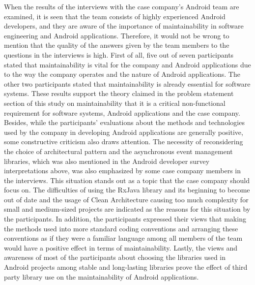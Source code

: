 When the results of the interviews with the case company's Android team are examined, it is seen that the team consists of highly experienced Android developers, and they are aware of the importance of maintainability in software engineering and Android applications. Therefore, it would not be wrong to mention that the quality of the answers given by the team members to the questions in the interviews is high. First of all, five out of seven participants stated that maintainability is vital for the company and Android applications due to the way the company operates and the nature of Android applications. The other two participants stated that maintainability is already essential for software systems. These results support the theory claimed in the problem statement section of this study on maintainability that it is a critical non-functional requirement for software systems, Android applications and the case company. Besides, while the participants' evaluations about the methods and technologies used by the company in developing Android applications are generally positive, some constructive criticism also draws attention. The necessity of reconsidering the choice of architectural pattern and the asynchronous event management libraries, which was also mentioned in the Android developer survey interpretations above, was also emphasized by some case company members in the interviews. This situation stands out as a topic that the case company should focus on. The difficulties of using the RxJava library and its beginning to become out of date and the usage of Clean Architecture causing too much complexity for small and medium-sized projects are indicated as the reasons for this situation by the participants. In addition, the participants expressed their views that making the methods used into more standard coding conventions and arranging these conventions as if they were a familiar language among all members of the team would have a positive effect in terms of maintainability. Lastly, the views and awareness of most of the participants about choosing the libraries used in Android projects among stable and long-lasting libraries prove the effect of third party library use on the maintainability of Android applications.

